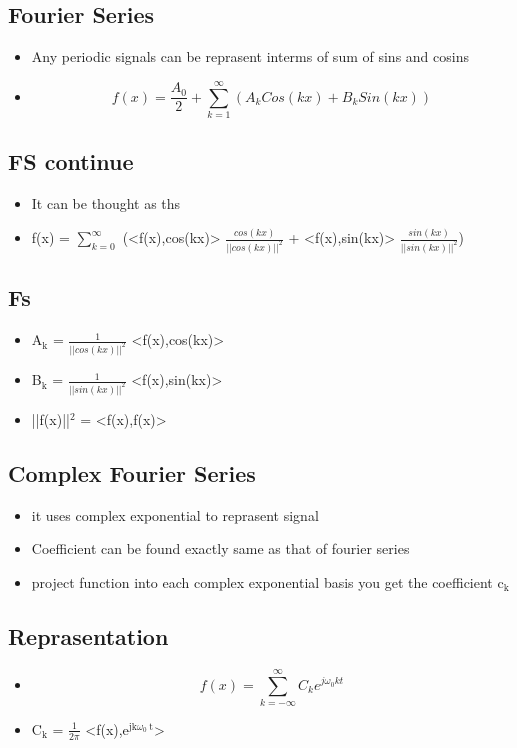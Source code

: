 \documentclass[11pt]{article}
\begin{document}
\subsection{Fourier Series}
\label{sec:org0d8a3cc}
\begin{itemize}
\item Any periodic signals can be reprasent interms of sum of sins and cosins
\item \[f(x) = \frac{A_0}{2} + \sum_{k=1}^{\infty} (A_k Cos(kx) + B_k Sin(kx))\]
\end{itemize}
\subsection{FS continue}
\label{sec:org04218ee}
\begin{itemize}
\item It can be thought as ths
\item f(x) = \(\sum_{k=0}^{\infty}\) (<f(x),cos(kx)> \(\frac{cos(kx)}{||cos(kx)||^2}\) + <f(x),sin(kx)> \(\frac{sin(kx)}{||sin(kx)||^2}\))
\end{itemize}
\subsection{Fs}
\label{sec:org2a7b4b8}
\begin{itemize}
\item A\(_{\text{k}}\) = \(\frac{1}{||cos(kx)||^2}\) <f(x),cos(kx)>
\item B\(_{\text{k}}\) = \(\frac{1}{||sin(kx)||^2}\) <f(x),sin(kx)>
\item ||f(x)||\(^{\text{2}}\) = <f(x),f(x)>
\end{itemize}

\subsection{Complex Fourier Series}
\label{sec:org6c276d2}
\begin{itemize}
\item it uses complex exponential to reprasent signal
\item Coefficient can be found exactly same as that of fourier series
\item project function into each complex exponential basis you get the coefficient c\(_{\text{k}}\)
\end{itemize}
\subsection{Reprasentation}
\label{sec:orgb584734}
\begin{itemize}
\item \[ f(x) =  \sum_{k=-\infty}^{\infty}  C_k e^{j\omega_0 kt}\]
\item C\(_{\text{k}}\) = \(\frac{1}{2\pi}\) <f(x),e\(^{\text{jk}\omega_{\text{0}} \ \text{t}}\)>
\end{itemize}
\end{document}
